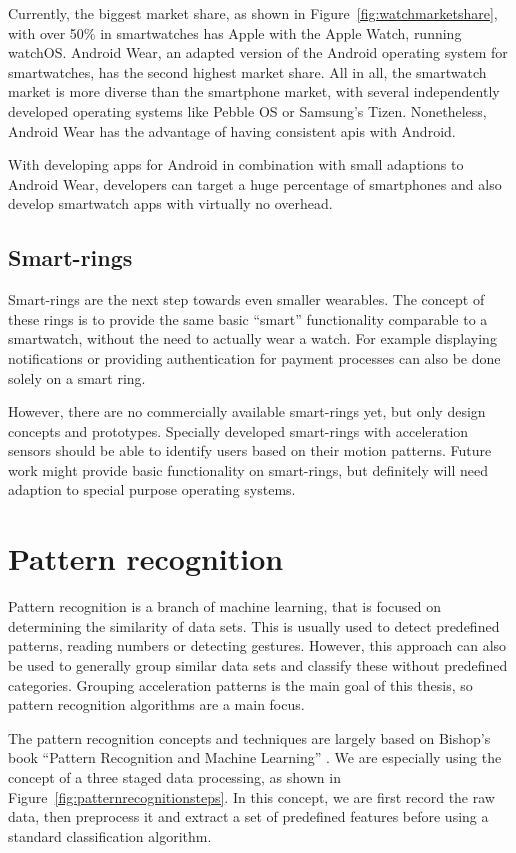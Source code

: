 Currently, the biggest market share, as shown in Figure~\ref{fig:watchmarketshare}, with over 50\% in smartwatches has Apple with the Apple Watch, running watchOS. Android Wear, an adapted version of the Android operating system for smartwatches, has the second highest market share. All in all, the smartwatch market is more diverse than the smartphone market, with several independently developed operating systems like Pebble OS or Samsung's Tizen. Nonetheless, Android Wear has the advantage of having consistent \Glspl{api} with Android. 

With developing \glspl{app} for Android in combination with small adaptions to Android Wear, developers can target a huge percentage of smartphones and also develop smartwatch apps with virtually no overhead.

\subsection{Smart-rings}
Smart-rings are the next step towards even smaller wearables. The concept of these rings is to provide the same basic ``smart'' functionality comparable to a smartwatch, without the need to actually wear a watch. For example displaying notifications or providing authentication for payment processes can also be done solely on a smart ring.

However, there are no commercially available smart-rings yet, but only design concepts and prototypes. Specially developed smart-rings with acceleration sensors should be able to identify users based on their motion patterns. Future work might provide basic functionality on smart-rings, but definitely will need adaption to special purpose operating systems. 

\section{Pattern recognition}
Pattern recognition is a branch of machine learning, that is focused on determining the similarity of data sets. This is usually used to detect predefined patterns, \eg reading numbers or detecting gestures. However, this approach can also be used to generally group similar data sets and classify these without predefined categories. Grouping acceleration patterns is the main goal of this thesis, so pattern recognition algorithms are a main focus.

The pattern recognition concepts and techniques are largely based on Bishop's book ``Pattern Recognition and Machine Learning'' \cite{bishop2006pattern}. We are especially using the concept of a three staged data processing, as shown in Figure~\ref{fig:patternrecognitionsteps}. In this concept, we are first record the raw data, then preprocess it and extract a set of predefined features before using a standard classification algorithm.

